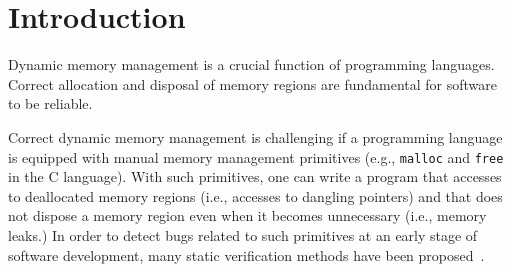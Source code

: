 \section{Introduction}
\label{sec:introduction}

Dynamic memory management is a crucial function of programming
languages.  Correct allocation and disposal of memory regions are
fundamental for software to be reliable.


Correct dynamic memory management is challenging if a programming
language is equipped with manual memory management primitives (e.g.,
\texttt{malloc} and \texttt{free} in the C language).  With such
primitives, one can write a program that accesses to deallocated
memory regions (i.e., accesses to dangling pointers) and that does not
dispose a memory region even when it becomes unnecessary (i.e., memory leaks.)
In order to detect bugs related to such primitives at an early stage
of software development, many static verification methods have been
proposed~\cite{DBLP:conf/aplas/SuenagaK09,DBLP:conf/pldi/HeineL03,DBLP:conf/sigsoft/XieA05,DBLP:journals/scp/SwamyHMGJ06,DBLP:conf/sas/OrlovichR06,DBLP:conf/issta/SuiYX12}.


